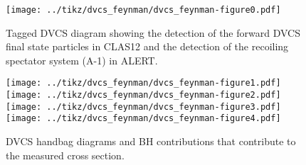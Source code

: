 \begin{figure}
   \centering
   \texttt{[image: ../tikz/dvcs\_feynman/dvcs\_feynman-figure0.pdf]}
   \caption{\label{fig:taggedDVCS}Tagged DVCS diagram showing the detection of 
   the forward DVCS final state particles in CLAS12 and the detection of the 
recoiling spectator system (A-1) in ALERT.}
\end{figure}

\begin{figure}
   \centering
   \texttt{[image: ../tikz/dvcs\_feynman/dvcs\_feynman-figure1.pdf]}
   \texttt{[image: ../tikz/dvcs\_feynman/dvcs\_feynman-figure2.pdf]}
   \texttt{[image: ../tikz/dvcs\_feynman/dvcs\_feynman-figure3.pdf]}
   \texttt{[image: ../tikz/dvcs\_feynman/dvcs\_feynman-figure4.pdf]}
   \caption{\label{fig:DVCShandbag}DVCS handbag diagrams and BH contributions 
   that contribute to the measured cross section.}
\end{figure}

